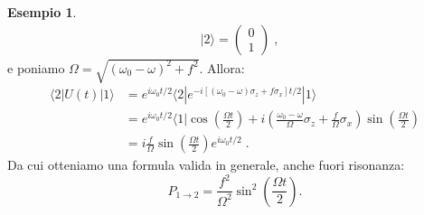 \documentclass[10pt,a4paper]{report}
\theoremstyle{definition}
\newtheorem{exm}{Esempio}
\numberwithin{equation}{section}
\newcommand{\bra}{\langle}
\newcommand{\ket}{\rangle}
\begin{document}
\begin{exm}
\begin{align*}
&|2\ket=\begin{pmatrix}
0 \\
1
\end{pmatrix}\;,
\end{align*}
e poniamo $\Omega=\sqrt{(\omega_0-\omega)^2+f^2}$. Allora:
\begin{align*}
\bra 2|U(t)|1\ket &= e^{i\omega_0t/2}\bra 2|e^{-i[(\omega_0-\omega)\sigma_z+f\sigma_x]t/2}|1\ket \\
&= e^{i\omega_0t/2}\bra 1|\cos\left(\frac{\Omega t}{2}\right)+i\left(\frac{\omega_0-\omega}{\Omega}\sigma_z+\frac{f}{\Omega}\sigma_x\right)\sin\left(\frac{\Omega t}{2}\right) \\
&= i\frac{f}{\Omega}\sin\left(\frac{\Omega t}{2}\right)e^{i\omega_0t/2}\;.
\end{align*}
Da cui otteniamo una formula valida in generale, anche fuori risonanza:
\begin{equation}
P_{1\to 2}=\frac{f^2}{\Omega^2}\sin^2\left(\frac{\Omega t}{2}\right).
\end{equation}
\end{exm}
\end{document}

